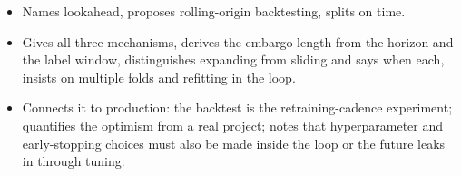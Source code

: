 \begin{interviewq}

\goodgreat
\begin{itemize}
    \item {} Names lookahead, proposes rolling-origin backtesting, splits on time.
    \item {} Gives all three mechanisms, derives the embargo length from the horizon and the label window, distinguishes expanding from sliding and says when each, insists on multiple folds and refitting in the loop.
    \item {} Connects it to production: the backtest is the retraining-cadence experiment; quantifies the optimism from a real project; notes that hyperparameter and early-stopping choices must also be made inside the loop or the future leaks in through tuning.
\end{itemize}

\end{interviewq}

